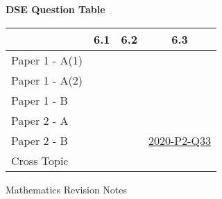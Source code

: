 \documentclass[12pt, a4paper]{article}
\begin{document}
\begin{absolutelynopagebreak}
\begin{center}
\textbf{DSE Question Table}
\end{center}
\begin{center}
\begin{tabular}{|l|c|c|c|}
\hline
        & 6.1 & 6.2 & 6.3 \\\hline
\hline
Paper 1 - A(1)&  &  &  \\
\hline
Paper 1 - A(2)&  &  &  \\
\hline
Paper 1 - B&  &  &  \\
\hline
\hline
Paper 2 - A&  &  &  \\
\hline
Paper 2 - B&  &  & \hyperref[DSE2020-CoreP2-Q33]{2020-P2-Q33} \\
\hline
\hline
Cross Topic&  &  &  \\
\hline
\end{tabular}
\end{center}
\end{absolutelynopagebreak}
\newpage
\newpage
\thispagestyle{empty}
\begin{center}
Mathematics Revision Notes\\\vspace{1cm}
\\\vspace{1cm}
{\fontsize{24pt}{24pt}\selectfont {Logarithmic Functions \NF}} \\\vspace{1cm}
\label{chapter:S4-7}

\end{center}
\vspace{0.5cm}
\hline
\end{document}
